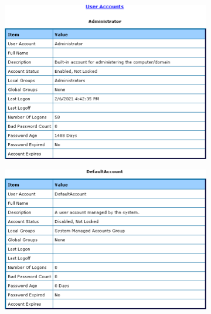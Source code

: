\begin{figure}[H]
    \centering
    \begin{subfigure}[b]{0.49\textwidth}
        \centering
        \includegraphics[width=\textwidth]{figures/pic12.png}
    \end{subfigure}
    \begin{subfigure}[b]{0.49\textwidth}
        \centering
        \includegraphics[width=\textwidth]{figures/pic13.png}
    \end{subfigure}
    \\
    \centering
    \begin{subfigure}[b]{0.49\textwidth}
        \centering

\end{subfigure}
\end{figure}
